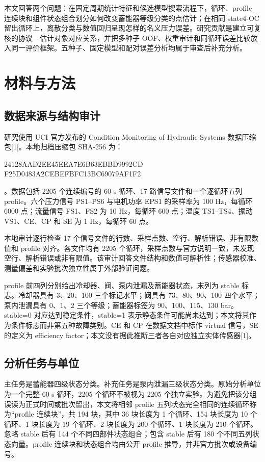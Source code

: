 \documentclass[UTF8,12pt,a4paper]{ctexart}
\newcommand{\hashblockcn}{%
\begin{center}
\begingroup\ttfamily\small
24128AAD2EE45EEA7E6B63EBBD9992CD\\
F25D0483A2CEBEFBFC13BC69079AF1F2
\endgroup
\end{center}}
\begin{document}
本文回答两个问题：在固定周期统计特征和候选模型搜索流程下，循环、profile 连续块和组件状态组合划分如何改变蓄能器等级分类的点估计；在相同 state4-OC 留出循环上，离散分类与数值回归呈现怎样的名义压力误差。研究贡献是建立可复核的协议—估计对象对应关系，并把多种子 OOF、权重审计和同循环误差比较放入同一评价框架。五种子、固定模型和配对误差分析均属于审查后补充分析。

\section{材料与方法}
\subsection{数据来源与结构审计}
研究使用 UCI 官方发布的 Condition Monitoring of Hydraulic Systems 数据压缩包[1]。本地归档压缩包 SHA-256 为：\hashblockcn。数据包括 2205 个连续编号的 60 s 循环、17 路信号文件和一个逐循环五列 profile。六个压力信号 PS1–PS6 与电机功率 EPS1 的采样率为 100 Hz，每循环 6000 点；流量信号 FS1、FS2 为 10 Hz，每循环 600 点；温度 TS1–TS4、振动 VS1、CE、CP 和 SE 为 1 Hz，每循环 60 点。

本地审计逐行检查 17 个信号文件的行数、采样点数、空行、解析错误、非有限数值和 profile 对齐。各文件均有 2205 个循环，采样点数与官方说明一致，未发现空行、解析错误或非有限值。该审计回答文件结构和数值可解析性；传感器校准、测量偏差和实验批次独立性属于外部验证问题。

profile 前四列分别给出冷却器、阀、泵内泄漏及蓄能器状态，末列为 stable 标志。冷却器具有 3、20、100 三个标记水平；阀具有 73、80、90、100 四个水平；泵内泄漏具有 0、1、2 三个等级；蓄能器标签为 90、100、115、130 bar。stable=0 对应达到稳定条件，stable=1 表示静态条件可能尚未达到；本文将其作为条件标志而非第五种故障类别。CE 和 CP 在数据文档中标作 virtual 信号，SE 的定义为 efficiency factor；本文没有据此推断三者各自对应独立实体传感器[1]。

\subsection{分析任务与单位}
主任务是蓄能器四级状态分类。补充任务是泵内泄漏三级状态分类。原始分析单位为一个完整 60 s 循环，2205 个循环不被视为 2205 个独立实验。为避免把该分组误读为正式时间或批次留出，本文将相邻 profile 五列状态完全相同的连续循环称为“profile 连续块”，共 194 块，其中 36 块长度为 1 个循环、154 块长度为 10 个循环、1 块长度为 19 个循环、2 块长度为 200 个循环、1 块长度为 210 个循环。忽略 stable 后有 144 个不同四部件状态组合；包含 stable 后有 180 个不同五列状态向量。profile 连续块和状态组合均由公开 profile 推导，并非官方批次或设备编号。
\end{document}
